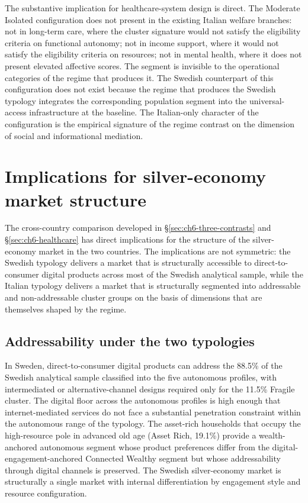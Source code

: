 The substantive implication for healthcare-system design is direct. The Moderate Isolated configuration does not present in the existing Italian welfare branches: not in long-term care, where the cluster signature would not satisfy the eligibility criteria on functional autonomy; not in income support, where it would not satisfy the eligibility criteria on resources; not in mental health, where it does not present elevated affective scores. The segment is invisible to the operational categories of the regime that produces it. The Swedish counterpart of this configuration does not exist because the regime that produces the Swedish typology integrates the corresponding population segment into the universal-access infrastructure at the baseline. The Italian-only character of the configuration is the empirical signature of the regime contrast on the dimension of social and informational mediation.

\section{Implications for silver-economy market structure}
\label{sec:ch6-silver-economy}

The cross-country comparison developed in \S\ref{sec:ch6-three-contrasts} and \S\ref{sec:ch6-healthcare} has direct implications for the structure of the silver-economy market in the two countries. The implications are not symmetric: the Swedish typology delivers a market that is structurally accessible to direct-to-consumer digital products across most of the Swedish analytical sample, while the Italian typology delivers a market that is structurally segmented into addressable and non-addressable cluster groups on the basis of dimensions that are themselves shaped by the regime.

\subsection{Addressability under the two typologies}
\label{sec:ch6-addressability}

In Sweden, direct-to-consumer digital products can address the 88.5\% of the Swedish analytical sample classified into the five autonomous profiles, with intermediated or alternative-channel designs required only for the 11.5\% Fragile cluster. The digital floor across the autonomous profiles is high enough that internet-mediated services do not face a substantial penetration constraint within the autonomous range of the typology. The asset-rich households that occupy the high-resource pole in advanced old age (Asset Rich, 19.1\%) provide a wealth-anchored autonomous segment whose product preferences differ from the digital-engagement-anchored Connected Wealthy segment but whose addressability through digital channels is preserved. The Swedish silver-economy market is structurally a single market with internal differentiation by engagement style and resource configuration.

